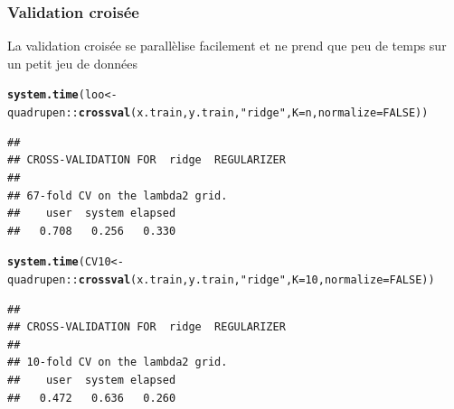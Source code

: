 \documentclass{beamer}\usepackage[]{graphicx}\usepackage[]{color}
\makeatletter
\newcommand{\hlnum}[1]{\textcolor[rgb]{0.686,0.059,0.569}{#1}}%
\newcommand{\hlstr}[1]{\textcolor[rgb]{0.192,0.494,0.8}{#1}}%
\newcommand{\hlopt}[1]{\textcolor[rgb]{0,0,0}{#1}}%
\newcommand{\hlstd}[1]{\textcolor[rgb]{0.345,0.345,0.345}{#1}}%
\newcommand{\hlkwb}[1]{\textcolor[rgb]{0.69,0.353,0.396}{#1}}%
\newcommand{\hlkwc}[1]{\textcolor[rgb]{0.333,0.667,0.333}{#1}}%
\newcommand{\hlkwd}[1]{\textcolor[rgb]{0.737,0.353,0.396}{\textbf{#1}}}%
\newenvironment{kframe}{%
 \def\at@end@of@kframe{}%
 \ifinner\ifhmode%
  \def\at@end@of@kframe{\end{minipage}}%
  \begin{minipage}{\columnwidth}%
 \fi\fi%
 \def\FrameCommand##1{\hskip\@totalleftmargin \hskip-\fboxsep
 \colorbox{shadecolor}{##1}\hskip-\fboxsep
     \hskip-\linewidth \hskip-\@totalleftmargin \hskip\columnwidth}%
 \MakeFramed {\advance\hsize-\width
   \@totalleftmargin\z@ \linewidth\hsize
   \@setminipage}}%
 {\par\unskip\endMakeFramed%
 \at@end@of@kframe}
\newenvironment{knitrout}{}{} %
\makeatother
\begin{document}
\begin{frame}[containsverbatim]
  \frametitle{Validation croisée}

  La validation croisée se parallèlise facilement et ne prend que peu de temps sur un petit jeu de données

\begin{knitrout}\scriptsize
{}\color{fgcolor}\begin{kframe}
\begin{alltt}
\hlkwd{system.time}\hlstd{(loo} \hlkwb{<-} \hlstd{quadrupen}\hlopt{::}\hlkwd{crossval}\hlstd{(x.train,y.train,}\hlstr{"ridge"}\hlstd{,}\hlkwc{K}\hlstd{=n,}\hlkwc{normalize}\hlstd{=}\hlnum{FALSE}\hlstd{))}
\end{alltt}
\begin{verbatim}
## 
## CROSS-VALIDATION FOR  ridge  REGULARIZER 
## 
## 67-fold CV on the lambda2 grid.
##    user  system elapsed 
##   0.708   0.256   0.330
\end{verbatim}
\end{kframe}
\end{knitrout}

\begin{knitrout}\scriptsize
{}\color{fgcolor}\begin{kframe}
\begin{alltt}
\hlkwd{system.time}\hlstd{(CV10} \hlkwb{<-} \hlstd{quadrupen}\hlopt{::}\hlkwd{crossval}\hlstd{(x.train,y.train,}\hlstr{"ridge"}\hlstd{,}\hlkwc{K}\hlstd{=}\hlnum{10}\hlstd{,}\hlkwc{normalize}\hlstd{=}\hlnum{FALSE}\hlstd{))}
\end{alltt}
\begin{verbatim}
## 
## CROSS-VALIDATION FOR  ridge  REGULARIZER 
## 
## 10-fold CV on the lambda2 grid.
##    user  system elapsed 
##   0.472   0.636   0.260
\end{verbatim}
\end{kframe}
\end{knitrout}

\end{frame}
\end{document}
